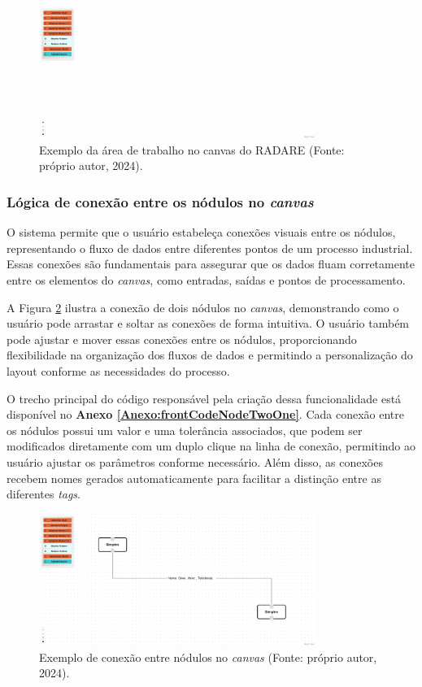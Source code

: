 \begin{figure}[htbp]
    \centering
    \includegraphics[width=0.8\textwidth]{figuras/empty-canvas.png}
    \caption{Exemplo da área de trabalho no canvas do RADARE (Fonte: próprio autor, 2024).}
    \label{Fig:EmptyCanvas}
\end{figure}

\subsubsection{Lógica de conexão entre os nódulos no \textit{canvas}}

O sistema permite que o usuário estabeleça conexões visuais entre os nódulos, representando o fluxo de dados entre diferentes pontos de um processo industrial. Essas conexões são fundamentais para assegurar que os dados fluam corretamente entre os elementos do \textit{canvas}, como entradas, saídas e pontos de processamento.

A Figura \ref{Fig:NodeConnections} ilustra a conexão de dois nódulos no \textit{canvas}, demonstrando como o usuário pode arrastar e soltar as conexões de forma intuitiva. O usuário também pode ajustar e mover essas conexões entre os nódulos, proporcionando flexibilidade na organização dos fluxos de dados e permitindo a personalização do layout conforme as necessidades do processo.

O trecho principal do código responsável pela criação dessa funcionalidade está disponível no \textbf{Anexo \ref{Anexo:frontCodeNodeTwoOne}}. Cada conexão entre os nódulos possui um valor e uma tolerância associados, que podem ser modificados diretamente com um duplo clique na linha de conexão, permitindo ao usuário ajustar os parâmetros conforme necessário. Além disso, as conexões recebem nomes gerados automaticamente para facilitar a distinção entre as diferentes \textit{tags}.

\begin{figure}[htbp]
    \centering
    \includegraphics[width=0.8\textwidth]{figuras/node-connection-example.png}
    \caption{Exemplo de conexão entre nódulos no \textit{canvas} (Fonte: próprio autor, 2024).}
    \label{Fig:NodeConnections}
\end{figure}

